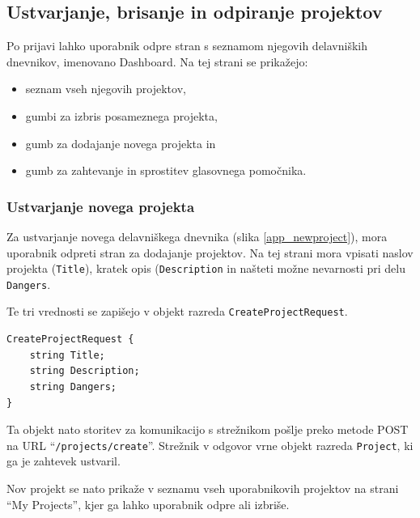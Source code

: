 \documentclass[a4paper, 12pt]{book}
\begin{document}
\subsection{Ustvarjanje, brisanje in odpiranje projektov}

Po prijavi lahko uporabnik odpre stran s seznamom njegovih delavniških dnevnikov, imenovano Dashboard.
Na tej strani se prikažejo:
\begin{itemize}
	\item seznam vseh njegovih projektov, 
	\item gumbi za izbris posameznega projekta,
	\item gumb za dodajanje novega projekta in
	\item gumb za zahtevanje in sprostitev glasovnega pomočnika.
\end{itemize}

\subsubsection{Ustvarjanje novega projekta}

Za ustvarjanje novega delavniškega dnevnika (slika \ref{app_newproject}), mora uporabnik odpreti stran za dodajanje projektov.
Na tej strani mora vpisati naslov projekta (\texttt{Title}), kratek opis (\texttt{Description} in našteti možne nevarnosti pri delu \texttt{Dangers}.

Te tri vrednosti se zapišejo v objekt razreda \texttt{CreateProjectRequest}.
\begin{Verbatim}[commandchars=+\[\]]
CreateProjectRequest {
    string Title;
    string Description;
    string Dangers;
}
\end{Verbatim}

Ta objekt nato storitev za komunikacijo s strežnikom pošlje preko metode POST na URL \enquote{\texttt{/projects/create}}.
Strežnik v odgovor vrne objekt razreda \texttt{Project}, ki ga je zahtevek ustvaril.

Nov projekt se nato prikaže v seznamu vseh uporabnikovih projektov na strani \enquote{My Projects}, kjer ga lahko uporabnik odpre ali izbriše.
\end{document}
